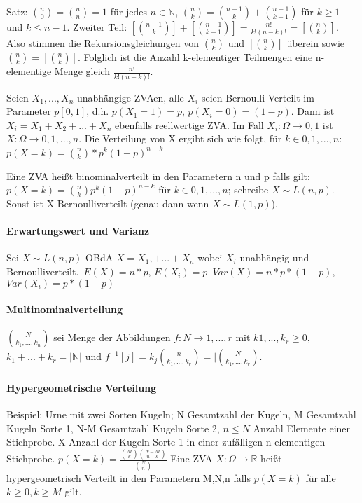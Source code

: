 \documentclass[a4paper]{article}
\begin{document}
\begin{multicols}{3}
    Satz: $\binom{n}{0}=\binom{n}{n}=1$ für jedes $n\in\mathbb{N}$, $\binom{n}{k}=\binom{n-1}{k}+\binom{n-1}{k-1}$ für $k\geq 1$ und $k\leq n-1$.
    Zweiter Teil: $[\binom{n-1}{k}]+[\binom{n-1}{k-1}]=\frac{n!}{k!(n-k)!} = [\binom{n}{k}]$. Also stimmen die Rekursionsgleichungen von $\binom{n}{k}$ und $[\binom{n}{k}]$ überein sowie $\binom{n}{k}=[\binom{n}{k}]$. Folglich ist die Anzahl k-elementiger Teilmengen eine n-elementige Menge gleich $\frac{n!}{k!(n-k)!}$.
    
    Seien $X_1,...,X_n$ unabhängige ZVAen, alle $X_i$ seien Bernoulli-Verteilt im Parameter $p[0,1]$, d.h. $p(X_1=1)=p$, $p(X_i=0)=(1-p)$. Dann ist $X_i=X_1+X_2+...+X_n$ ebenfalls reellwertige ZVA. Im Fall $X_i:\Omega\rightarrow {0,1}$ ist $X:\Omega\rightarrow {0,1,...,n}$. Die Verteilung von X ergibt sich wie folgt, für $k\in {0,1,...,n}$: $p(X=k)=\binom{n}{k}*p^k(1-p)^{n-k}$
    
    Eine ZVA heißt binominalverteilt in den Parametern n und p falls gilt: $p(X=k)=\binom{n}{k}p^k (1-p)^{n-k}$ für $k\in{0,1,...,n}$; schreibe $X\sim L(n,p)$. Sonst ist X Bernoulliverteilt (genau dann wenn $X\sim L(1,p)$).
    
    \paragraph{Erwartungswert und Varianz}
    Sei $X\sim L(n,p)$ OBdA $X=X_1,+...+X_n$ wobei $X_i$ unabhängig und Bernoulliverteilt.\
    $E(X)=n*p$, $E(X_i)=p$\
    $Var(X)=n*p*(1-p)$, $Var(X_i)=p*(1-p)$
    
    \paragraph{Multinominalverteilung}
    $\binom{N}{k_1,...,k_n}$ sei Menge der Abbildungen $f:N\rightarrow {1,...,r}$ mit $k1,...,k_r\geq 0$, $k_1+...+k_r=|\mathbb{N}|$ und $f^{-1}[{j}]=k_j \binom{n}{k_1,...,k_r} = |\binom{N}{k_1,...,k_r}$.
    
    \paragraph{Hypergeometrische Verteilung}
    Beispiel: Urne mit zwei Sorten Kugeln; N Gesamtzahl der Kugeln, M Gesamtzahl Kugeln Sorte 1, N-M Gesamtzahl Kugeln Sorte 2, $n\leq N$ Anzahl Elemente einer Stichprobe. X Anzahl der Kugeln Sorte 1 in einer zufälligen n-elementigen Stichprobe.
    $p(X=k)=\frac{\binom{M}{k}\binom{N-M}{n-k}}{\binom{N}{n}}$
    Eine ZVA $X:\Omega\rightarrow \mathbb{R}$ heißt hypergeometrisch Verteilt in den Parametern M,N,n falls $p(X=k)$ für alle $k\geq 0, k\geq M$ gilt.
    

\end{multicols}
\end{document}
